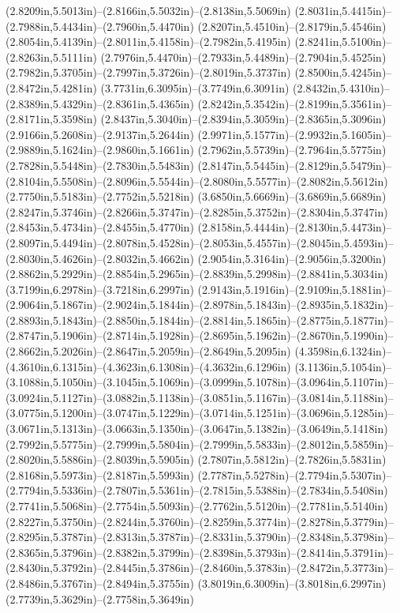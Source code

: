 (2.8209in,5.5013in)--(2.8166in,5.5032in)--(2.8138in,5.5069in) (2.8031in,5.4415in)--(2.7988in,5.4434in)--(2.7960in,5.4470in) (2.8207in,5.4510in)--(2.8179in,5.4546in) (2.8054in,5.4139in)--(2.8011in,5.4158in)--(2.7982in,5.4195in) (2.8241in,5.5100in)--(2.8263in,5.5111in) (2.7976in,5.4470in)--(2.7933in,5.4489in)--(2.7904in,5.4525in) (2.7982in,5.3705in)--(2.7997in,5.3726in)--(2.8019in,5.3737in) (2.8500in,5.4245in)--(2.8472in,5.4281in) (3.7731in,6.3095in)--(3.7749in,6.3091in) (2.8432in,5.4310in)--(2.8389in,5.4329in)--(2.8361in,5.4365in) (2.8242in,5.3542in)--(2.8199in,5.3561in)--(2.8171in,5.3598in) (2.8437in,5.3040in)--(2.8394in,5.3059in)--(2.8365in,5.3096in) (2.9166in,5.2608in)--(2.9137in,5.2644in) (2.9971in,5.1577in)--(2.9932in,5.1605in)--(2.9889in,5.1624in)--(2.9860in,5.1661in) (2.7962in,5.5739in)--(2.7964in,5.5775in) (2.7828in,5.5448in)--(2.7830in,5.5483in) (2.8147in,5.5445in)--(2.8129in,5.5479in)--(2.8104in,5.5508in)--(2.8096in,5.5544in)--(2.8080in,5.5577in)--(2.8082in,5.5612in) (2.7750in,5.5183in)--(2.7752in,5.5218in) (3.6850in,5.6669in)--(3.6869in,5.6689in) (2.8247in,5.3746in)--(2.8266in,5.3747in)--(2.8285in,5.3752in)--(2.8304in,5.3747in) (2.8453in,5.4734in)--(2.8455in,5.4770in) (2.8158in,5.4444in)--(2.8130in,5.4473in)--(2.8097in,5.4494in)--(2.8078in,5.4528in)--(2.8053in,5.4557in)--(2.8045in,5.4593in)--(2.8030in,5.4626in)--(2.8032in,5.4662in) (2.9054in,5.3164in)--(2.9056in,5.3200in) (2.8862in,5.2929in)--(2.8854in,5.2965in)--(2.8839in,5.2998in)--(2.8841in,5.3034in) (3.7199in,6.2978in)--(3.7218in,6.2997in) (2.9143in,5.1916in)--(2.9109in,5.1881in)--(2.9064in,5.1867in)--(2.9024in,5.1844in)--(2.8978in,5.1843in)--(2.8935in,5.1832in)--(2.8893in,5.1843in)--(2.8850in,5.1844in)--(2.8814in,5.1865in)--(2.8775in,5.1877in)--(2.8747in,5.1906in)--(2.8714in,5.1928in)--(2.8695in,5.1962in)--(2.8670in,5.1990in)--(2.8662in,5.2026in)--(2.8647in,5.2059in)--(2.8649in,5.2095in) (4.3598in,6.1324in)--(4.3610in,6.1315in)--(4.3623in,6.1308in)--(4.3632in,6.1296in) (3.1136in,5.1054in)--(3.1088in,5.1050in)--(3.1045in,5.1069in)--(3.0999in,5.1078in)--(3.0964in,5.1107in)--(3.0924in,5.1127in)--(3.0882in,5.1138in)--(3.0851in,5.1167in)--(3.0814in,5.1188in)--(3.0775in,5.1200in)--(3.0747in,5.1229in)--(3.0714in,5.1251in)--(3.0696in,5.1285in)--(3.0671in,5.1313in)--(3.0663in,5.1350in)--(3.0647in,5.1382in)--(3.0649in,5.1418in) (2.7992in,5.5775in)--(2.7999in,5.5804in)--(2.7999in,5.5833in)--(2.8012in,5.5859in)--(2.8020in,5.5886in)--(2.8039in,5.5905in) (2.7807in,5.5812in)--(2.7826in,5.5831in) (2.8168in,5.5973in)--(2.8187in,5.5993in) (2.7787in,5.5278in)--(2.7794in,5.5307in)--(2.7794in,5.5336in)--(2.7807in,5.5361in)--(2.7815in,5.5388in)--(2.7834in,5.5408in) (2.7741in,5.5068in)--(2.7754in,5.5093in)--(2.7762in,5.5120in)--(2.7781in,5.5140in) (2.8227in,5.3750in)--(2.8244in,5.3760in)--(2.8259in,5.3774in)--(2.8278in,5.3779in)--(2.8295in,5.3787in)--(2.8313in,5.3787in)--(2.8331in,5.3790in)--(2.8348in,5.3798in)--(2.8365in,5.3796in)--(2.8382in,5.3799in)--(2.8398in,5.3793in)--(2.8414in,5.3791in)--(2.8430in,5.3792in)--(2.8445in,5.3786in)--(2.8460in,5.3783in)--(2.8472in,5.3773in)--(2.8486in,5.3767in)--(2.8494in,5.3755in) (3.8019in,6.3009in)--(3.8018in,6.2997in) (2.7739in,5.3629in)--(2.7758in,5.3649in) 